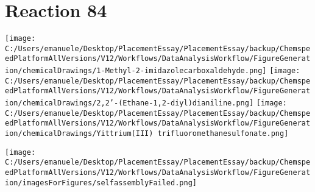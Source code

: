\documentclass{article}%
\begin{document}
\section*{Reaction 84}%
%
\begin{scheme}[H]%
\begin{minipage}{0.5\textwidth}%
\texttt{[image: C:/Users/emanuele/Desktop/PlacementEssay/PlacementEssay/backup/ChemspeedPlatformAllVersions/V12/Workflows/DataAnalysisWorkflow/FigureGeneration/chemicalDrawings/1-Methyl-2-imidazolecarboxaldehyde.png]}%
\texttt{[image: C:/Users/emanuele/Desktop/PlacementEssay/PlacementEssay/backup/ChemspeedPlatformAllVersions/V12/Workflows/DataAnalysisWorkflow/FigureGeneration/chemicalDrawings/2,2'-(Ethane-1,2-diyl)dianiline.png]}%
\texttt{[image: C:/Users/emanuele/Desktop/PlacementEssay/PlacementEssay/backup/ChemspeedPlatformAllVersions/V12/Workflows/DataAnalysisWorkflow/FigureGeneration/chemicalDrawings/Yittrium(III) trifluoromethanesulfonate.png]}%
\end{minipage}%
\begin{minipage}{0.5\textwidth}%
\begin{center}%
\texttt{[image: C:/Users/emanuele/Desktop/PlacementEssay/PlacementEssay/backup/ChemspeedPlatformAllVersions/V12/Workflows/DataAnalysisWorkflow/FigureGeneration/imagesForFigures/selfassemblyFailed.png]}%
\end{center}%
\end{minipage}%
\caption{Self-assembly of components 12, 20, with Yittrium(III) in a 3.0:1.5:1.0 molar ratio in CH$_3$CN at 60\textdegree C for 40h. These are the reagents (starting materials) for reaction 84.}%
\end{scheme}%
\end{document}

